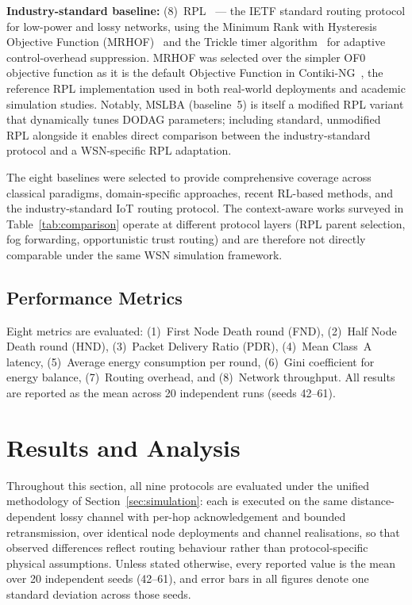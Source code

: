 \documentclass[12pt]{article}
\begin{document}
\textbf{Industry-standard baseline:}
(8)~RPL~\cite{winter2012} --- the IETF standard routing protocol for
low-power and lossy networks, using the Minimum Rank with Hysteresis
Objective Function (MRHOF)~\cite{gnawali2012} and the Trickle timer
algorithm~\cite{levis2011} for adaptive control-overhead suppression.
MRHOF was selected over the simpler OF0 objective function as it is
the default Objective Function in Contiki-NG~\cite{oikonomou2022},
the reference RPL implementation used in both real-world deployments
and academic simulation studies. Notably, MSLBA (baseline~5) is
itself a modified RPL variant that dynamically tunes DODAG
parameters; including standard, unmodified RPL alongside it enables
direct comparison between the industry-standard protocol and a
WSN-specific RPL adaptation.

The eight baselines were selected to provide comprehensive coverage
across classical paradigms, domain-specific approaches, recent
RL-based methods, and the industry-standard IoT routing protocol. The
context-aware works surveyed in Table~\ref{tab:comparison} operate at
different protocol layers (RPL parent selection, fog forwarding,
opportunistic trust routing) and are therefore not directly
comparable under the same WSN simulation framework.

\subsection{Performance Metrics}

Eight metrics are evaluated: (1)~First Node Death round (FND),
(2)~Half Node Death round (HND), (3)~Packet Delivery Ratio (PDR),
(4)~Mean Class~A latency, (5)~Average energy consumption per round,
(6)~Gini coefficient for energy balance, (7)~Routing overhead, and
(8)~Network throughput. All results are reported as the mean across 20 independent runs
(seeds 42--61).

\section{Results and Analysis}
\label{sec:results}

Throughout this section, all nine protocols are evaluated under the unified
methodology of Section~\ref{sec:simulation}: each is executed on the same distance-dependent
lossy channel with per-hop acknowledgement and bounded retransmission, over
identical node deployments and channel realisations, so that observed
differences reflect routing behaviour rather than protocol-specific physical
assumptions. Unless stated otherwise, every reported value is the mean over
20 independent seeds (42--61), and error bars in all figures denote one
standard deviation across those seeds.
\end{document}
